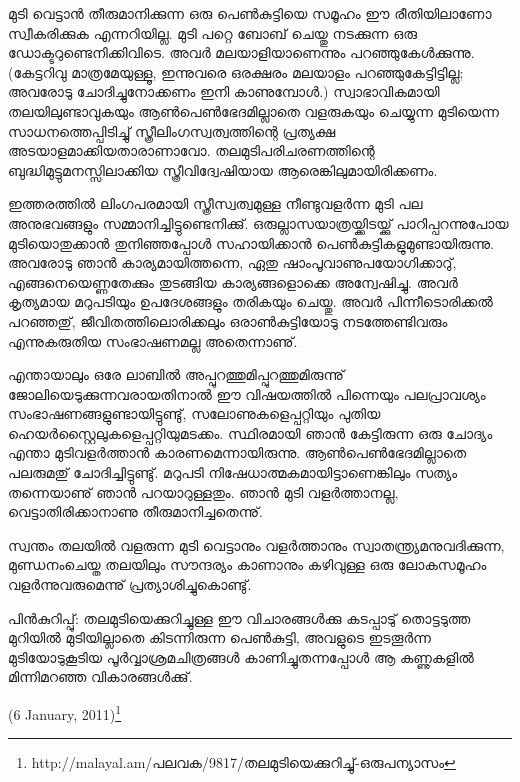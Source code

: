 മുടി വെട്ടാന്‍ തീരുമാനിക്കുന്ന ഒരു പെണ്‍കുട്ടിയെ സമൂഹം ഈ രീതിയിലാണോ സ്വീകരിക്കുക എന്നറിയില്ല. മുടി പറ്റെ 
ബോബ് ചെയ്തു നടക്കുന്ന ഒരു ഡോക്ടറുണ്ടെനിക്കിവിടെ. അവര്‍ മലയാളിയാണെന്നും പറഞ്ഞുകേള്‍ക്കുന്നു. (കേട്ടറിവു മാത്രമേയുള്ളൂ, 
ഇന്നുവരെ ഒരക്ഷരം മലയാളം പറഞ്ഞുകേട്ടിട്ടില്ല; അവരോടു ചോദിച്ചുനോക്കണം ഇനി കാണുമ്പോള്‍.) സ്വാഭാവികമായി 
തലയിലുണ്ടാവുകയും ആണ്‍പെണ്‍ഭേദമില്ലാതെ വളരുകയും ചെയ്യുന്ന മുടിയെന്ന സാധനത്തെപ്പിടിച്ചു് 
സ്ത്രീലിംഗസ്വത്വത്തിന്റെ പ്രത്യക്ഷ അടയാളമാക്കിയതാരാണാവോ. തലമുടിപരിചരണത്തിന്റെ ബുദ്ധിമുട്ടുമനസ്സിലാക്കിയ സ്ത്രീവിദ്വേഷിയായ ആരെങ്കിലുമായിരിക്കണം.

ഇത്തരത്തില്‍ ലിംഗപരമായി സ്ത്രീസ്വത്വമുള്ള നീണ്ടുവളര്‍ന്ന മുടി പല അനുഭവങ്ങളും സമ്മാനിച്ചിട്ടുണ്ടെനിക്കു്. 
ഒരുല്ലാസയാത്രയ്ക്കിടയ്ക്കു് പാറിപ്പറന്നുപോയ മുടിയൊതുക്കാന്‍ തുനിഞ്ഞപ്പോള്‍ സഹായിക്കാന്‍ 
പെണ്‍കുട്ടികളുമുണ്ടായിരുന്നു. അവരോടു ഞാന്‍ കാര്യമായിത്തന്നെ, ഏതു ഷാംപൂവാണുപയോഗിക്കാറു്, എങ്ങനെയെണ്ണതേക്കും 
തുടങ്ങിയ കാര്യങ്ങളൊക്കെ അന്വേഷിച്ചു. അവര്‍ കൃത്യമായ മറുപടിയും ഉപദേശങ്ങളും തരികയും ചെയ്തു. അവര്‍ പിന്നീടൊരിക്കല്‍ പറഞ്ഞതു്, 
ജീവിതത്തിലൊരിക്കലും ഒരാണ്‍കുട്ടിയോടു നടത്തേണ്ടിവരും എന്നുകരുതിയ സംഭാഷണമല്ല അതെന്നാണു്.

എന്തായാലും ഒരേ ലാബില്‍ അപ്പുറത്തുമിപ്പുറത്തുമിരുന്നു് ജോലിയെടുക്കുന്നവരായതിനാല്‍ ഈ വിഷയത്തില്‍ പിന്നെയും 
പലപ്രാവശ്യം സംഭാഷണങ്ങളുണ്ടായിട്ടുണ്ടു്, സലോണുകളെപ്പറ്റിയും പുതിയ ഹെയര്‍സ്റ്റൈലുകളെപ്പറ്റിയുമടക്കം. 
സ്ഥിരമായി ഞാന്‍ കേട്ടിരുന്ന ഒരു ചോദ്യം എന്താ മുടിവളര്‍ത്താന്‍ കാരണമെന്നായിരുന്നു. ആണ്‍പെണ്‍ഭേദമില്ലാതെ 
പലരുമതു് ചോദിച്ചിട്ടുണ്ടു്. മറുപടി നിഷേധാത്മകമായിട്ടാണെങ്കിലും സത്യം തന്നെയാണു് ഞാന്‍ പറയാറുള്ളതും. ഞാന്‍ മുടി 
വളര്‍ത്താനല്ല, വെട്ടാതിരിക്കാനാണു തീരുമാനിച്ചതെന്നു്.

സ്വന്തം തലയില്‍ വളരുന്ന മുടി വെട്ടാനും വളര്‍ത്താനും സ്വാതന്ത്ര്യമനുവദിക്കുന്ന, മുണ്ഡനംചെയ്ത തലയിലും 
സൗന്ദര്യം കാണാനും കഴിവുള്ള ഒരു ലോകസമൂഹം വളര്‍ന്നുവരുമെന്നു് പ്രത്യാശിച്ചുകൊണ്ടു്.

പിന്‍കുറിപ്പു്: തലമുടിയെക്കുറിച്ചുള്ള ഈ വിചാരങ്ങള്‍ക്കു കടപ്പാടു് തൊട്ടടുത്ത മുറിയില്‍ മുടിയില്ലാതെ കിടന്നിരുന്ന പെണ്‍കുട്ടി, അവളുടെ ഇടതൂര്‍ന്ന മുടിയോടുകൂടിയ പൂര്‍വ്വാശ്രമചിത്രങ്ങള്‍ കാണിച്ചുതന്നപ്പോള്‍ ആ കണ്ണുകളില്‍ മിന്നിമറഞ്ഞ വികാരങ്ങള്‍ക്കു്.
\begin{flushright}(6 January, 2011)\footnote{http://malayal.am/പലവക/9817/തലമുടിയെക്കുറിച്ചു്-ഒരുപന്യാസം}\end{flushright}
\newpage
\setlength{\parskip}{5pt plus 1pt minus 1pt} %
